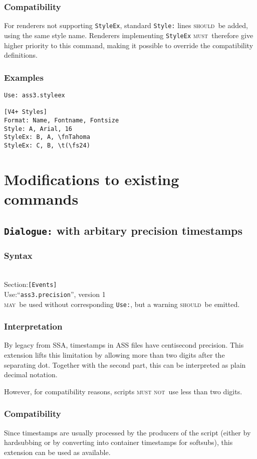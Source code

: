 \documentclass[11pt,a4paper]{article}
\newcommand{\may}{\textsc{may}}
\newcommand{\should}{\textsc{should}}
\newcommand{\must}{\textsc{must}}
\newcommand{\mustnot}{\textsc{must not}}
\newcommand{\syntax}[1]{
	\subsubsection*{Syntax}
	\begin{tabbing}
	\hspace{2cm}\=\\[-16pt]
	#1
	\end{tabbing}
}
\newcommand{\mayuse}{\may\ be used without corresponding \texttt{Use:},
	but a warning \should\ be emitted.}
\newcommand{\secspec}[1]{Section:\>\texttt{#1}}
\newcommand{\usespec}[3]{Use:\>``\texttt{#1}'', version #2\\\> #3}
\begin{document}
\subsubsection*{Compatibility}
For renderers not supporting \verb!StyleEx!, standard \verb!Style:! lines
\should\ be added, using the same style name. Renderers implementing
\verb!StyleEx! \must\ therefore give higher priority to this command,
making it possible to override the compatibility definitions.

\subsubsection*{Examples}
\begin{verbatim}
Use: ass3.styleex

[V4+ Styles]
Format: Name, Fontname, Fontsize
Style: A, Arial, 16
StyleEx: B, A, \fnTahoma
StyleEx: C, B, \t(\fs24)
\end{verbatim}

\section{Modifications to existing commands}
\subsection{\texttt{Dialogue:} with arbitary precision timestamps}
\syntax{
	\secspec{[Events]}\\
	\usespec{ass3.precision}{1}{\mayuse}
}

\subsubsection*{Interpretation}
By legacy from SSA, timestamps in ASS files have centisecond precision.
This extension lifts this limitation by allowing more than two digits
after the separating dot. Together with the second part, this can be
interpreted as plain decimal notation.

However, for compatibility reasons, scripts \mustnot\ use less than two
digits.

\subsubsection*{Compatibility}
Since timestamps are usually processed by the producers of the script
(either by hardsubbing or by converting into container timestamps for
softsubs), this extension can be used as available.
 
\end{document}
